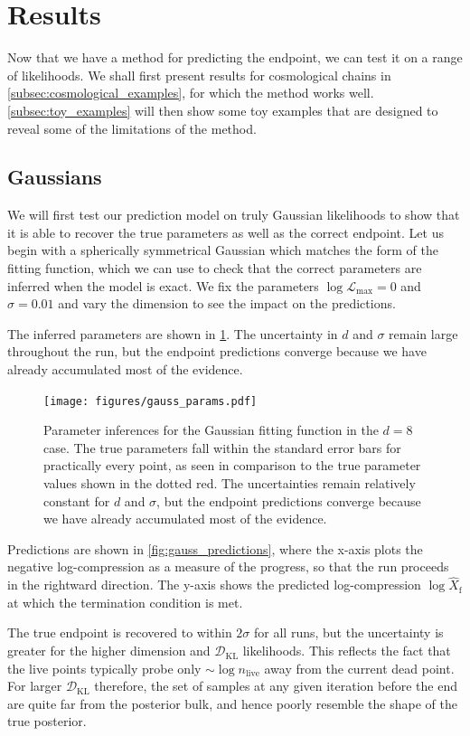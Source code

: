 \documentclass[usenatbib]{mnras}
\newcommand{\DKL}{\mathcal{D}_\mathrm{KL}}
\begin{document}
\section{Results}\label{sec:results}
Now that we have a method for predicting the endpoint, we can test it on a range of likelihoods. We shall first present results for cosmological chains in \cref{subsec:cosmological_examples}, for which the method works well. \cref{subsec:toy_examples} will then show some toy examples that are designed to reveal some of the limitations of the method.

\subsection{Gaussians}\label{subsec:gaussians}
We will first test our prediction model on truly Gaussian likelihoods to show that it is able to recover the true parameters as well as the correct endpoint. Let us begin with a spherically symmetrical Gaussian which matches the form of the fitting function, which we can use to check that the correct parameters are inferred when the model is exact. We fix the parameters $\log\mathcal{L}_\mathrm{max} = 0$ and $\sigma = 0.01$ and vary the dimension to see the impact on the predictions.
\par
The inferred parameters are shown in \cref{fig:gauss_params}. The uncertainty in $d$ and $\sigma$ remain large throughout the run, but the endpoint predictions converge because we have already accumulated most of the evidence.
\par
\begin{figure}
\begin{center}
	\texttt{[image: figures/gauss\_params.pdf]}
\end{center}
\caption{Parameter inferences for the Gaussian fitting function in the $d=8$ case. The true parameters fall within the standard error bars for practically every point, as seen in comparison to the true parameter values shown in the dotted red. The uncertainties remain relatively constant for $d$ and $\sigma$, but the endpoint predictions converge because we have already accumulated most of the evidence.}
\label{fig:gauss_params}
\end{figure}
Predictions are shown in \cref{fig:gauss_predictions}, where the x-axis plots the negative log-compression as a measure of the progress, so that the run proceeds in the rightward direction. The y-axis shows the predicted log-compression $\log\hat{X}_\mathrm{f}$ at which the termination condition is met.
\par
The true endpoint is recovered to within $2\sigma$ for all runs, but the uncertainty is greater for the higher dimension and $\DKL$ likelihoods. This reflects the fact that the live points typically probe only $\sim \log n_\mathrm{live}$ away from the current dead point. For larger $\DKL$ therefore, the set of samples at any given iteration before the end are quite far from the posterior bulk, and hence poorly resemble the shape of the true posterior.
\end{document}
